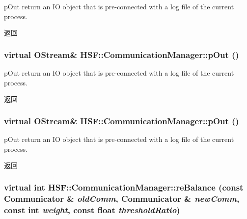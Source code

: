 pOut return an IO object that is pre-\/connected with a log file of the current process. \begin{DoxyReturn}{返回}

\end{DoxyReturn}
\hypertarget{classHSF_1_1CommunicationManager_a90bf65f0e45df795cf861f829b82ac3d}{
\subsubsection[{pOut}]{\setlength{\rightskip}{0pt plus 5cm}virtual {\bf OStream}\& HSF::CommunicationManager::pOut ()}}
\label{classHSF_1_1CommunicationManager_a90bf65f0e45df795cf861f829b82ac3d}


pOut return an IO object that is pre-\/connected with a log file of the current process. \begin{DoxyReturn}{返回}

\end{DoxyReturn}
\hypertarget{classHSF_1_1CommunicationManager_a90bf65f0e45df795cf861f829b82ac3d}{
\subsubsection[{pOut}]{\setlength{\rightskip}{0pt plus 5cm}virtual {\bf OStream}\& HSF::CommunicationManager::pOut ()}}
\label{classHSF_1_1CommunicationManager_a90bf65f0e45df795cf861f829b82ac3d}


pOut return an IO object that is pre-\/connected with a log file of the current process. \begin{DoxyReturn}{返回}

\end{DoxyReturn}
\hypertarget{classHSF_1_1CommunicationManager_a23ed29de80835c5f413b2fefa2d98bdb}{
\subsubsection[{reBalance}]{\setlength{\rightskip}{0pt plus 5cm}virtual int HSF::CommunicationManager::reBalance (const {\bf Communicator} \& {\em oldComm}, \/  {\bf Communicator} \& {\em newComm}, \/  const int {\em weight}, \/  const float {\em thresholdRatio})}}
\label{classHSF_1_1CommunicationManager_a23ed29de80835c5f413b2fefa2d98bdb}


